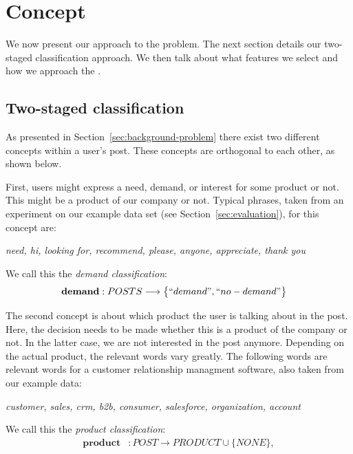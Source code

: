 \section{Concept}
\label{sec:concept}

We now present our approach to the \nto problem.
The next section details our two-staged classification approach.
We then talk about what features we select and how we approach the \emph{\documentmismatch}.

\subsection{Two-staged classification}
As presented in Section~\ref{sec:background-problem} there exist two different concepts within a user's post.
These concepts are orthogonal to each other, as shown below.

First, users might express a need, demand, or interest for some product or not.
This might be a product of our company or not.
Typical phrases, taken from an experiment on our example data set (see Section~\ref{sec:evaluation}), for this concept are:
\begin{center}
	\textit{need, hi, looking for, recommend, please, anyone, appreciate, thank you}
\end{center}
We call this the \emph{demand classification}:
\begin{align}
	\mathbf{demand}&: POSTS \longrightarrow \big\{ ``demand", ``no-demand" \big\}
\end{align}

The second concept is about which product the user is talking about in the post.
Here, the decision needs to be made whether this is a product of the company or not.
In the latter case, we are not interested in the post anymore.
Depending on the actual product, the relevant words vary greatly.
The following words are relevant words for a customer relationship managment software, also taken from our example data:
\begin{center}
	\textit{customer, sales, crm, b2b, consumer, salesforce, organization, account}
\end{center}

We call this the \emph{product classification}:
\begin{align}
	\mathbf{product}&: POST \longrightarrow  PRODUCT \cup \big\{ NONE \big\}, \\
\end{align}

